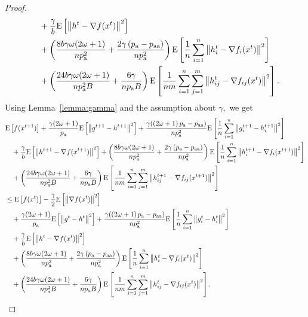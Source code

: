 \documentclass{article}
\newcommand*{\probavailable}{\ensuremath{p_{\textnormal{a}}}}
\newcommand*{\probpairaa}{\ensuremath{p_{\textnormal{aa}}}}
\begin{document}
\begin{proof}
\begin{align*}
      &\quad + \frac{\gamma}{b} \Exp{\norm{h^{t} - \nabla f(x^{t})}^2} \\
      &\quad + \left(\frac{8 b \gamma \omega (2 \omega + 1)}{n \probavailable^2} + \frac{2 \gamma \left(\probavailable - \probpairaa\right)}{n \probavailable^2}\right)\Exp{\frac{1}{n}\sum_{i=1}^n\norm{h^{t}_i - \nabla f_i(x^{t})}^2} \\
      &\quad + \left(\frac{24 b \gamma \omega (2 \omega + 1)}{n \probavailable^2 B} + \frac{6 \gamma }{n \probavailable B}\right)\Exp{\frac{1}{nm}\sum_{i=1}^n\sum_{j=1}^m\norm{h^{t}_{ij} - \nabla f_{ij}(x^{t})}^2}.
    \end{align*}
    Using Lemma~\ref{lemma:gamma} and the assumption about $\gamma,$ we get
    \begin{align*}
      &\Exp{f(x^{t + 1})} + \frac{\gamma (2 \omega + 1)}{\probavailable} \Exp{\norm{g^{t+1} - h^{t+1}}^2} + \frac{\gamma (\left(2 \omega + 1\right)\probavailable - \probpairaa)}{n \probavailable^2} \Exp{\frac{1}{n}\sum_{i=1}^n\norm{g^{t+1}_i - h^{t+1}_i}^2}\\
      &\quad  + \frac{\gamma}{b} \Exp{\norm{h^{t+1} - \nabla f(x^{t+1})}^2} + \left(\frac{8 b \gamma \omega (2 \omega + 1)}{n \probavailable^2} + \frac{2 \gamma \left(\probavailable - \probpairaa\right)}{n \probavailable^2}\right) \Exp{\frac{1}{n}\sum_{i=1}^n\norm{h^{t+1}_i - \nabla f_i(x^{t+1})}^2}\\
      &\quad + \left(\frac{24 b \gamma \omega (2 \omega + 1)}{n \probavailable^2 B} + \frac{6 \gamma }{n \probavailable B}\right) \Exp{\frac{1}{nm}\sum_{i=1}^n\sum_{j=1}^m\norm{h^{t+1}_{ij} - \nabla f_{ij}(x^{t+1})}^2} \\
      &\leq \Exp{f(x^t)} - \frac{\gamma}{2}\Exp{\norm{\nabla f(x^t)}^2} \\
      &\quad + \frac{\gamma (2 \omega + 1)}{\probavailable} \Exp{\norm{g^{t} - h^{t}}^2} + \frac{\gamma (\left(2 \omega + 1\right)\probavailable - \probpairaa)}{n \probavailable^2} \Exp{\frac{1}{n}\sum_{i=1}^n\norm{g^{t}_i - h^{t}_i}^2} \\
      &\quad + \frac{\gamma}{b} \Exp{\norm{h^{t} - \nabla f(x^{t})}^2} \\
      &\quad + \left(\frac{8 b \gamma \omega (2 \omega + 1)}{n \probavailable^2} + \frac{2 \gamma \left(\probavailable - \probpairaa\right)}{n \probavailable^2}\right)\Exp{\frac{1}{n}\sum_{i=1}^n\norm{h^{t}_i - \nabla f_i(x^{t})}^2} \\
      &\quad + \left(\frac{24 b \gamma \omega (2 \omega + 1)}{n \probavailable^2 B} + \frac{6 \gamma }{n \probavailable B}\right)\Exp{\frac{1}{nm}\sum_{i=1}^n\sum_{j=1}^m\norm{h^{t}_{ij} - \nabla f_{ij}(x^{t})}^2}.

\end{align*}
\end{proof}
\end{document}
